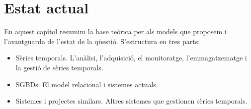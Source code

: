 \chapter{Estat actual} 
\label{cap:estat}


En aquest capítol resumim la base teòrica per als models que proposem
i l'avantguarda de l'estat de la qüestió. S'estructura en tres parts:

\begin{itemize}

\item Sèries temporals. L'anàlisi, l'adquisició, el monitoratge,
  l'emmagatzematge i la gestió de sèries temporals.

\item \Glspl{SGBD}. El model relacional i sistemes
  actuals.

\item Sistemes i projectes similars. Altres sistemes que gestionen
  sèries temporals.

\end{itemize}











  
















